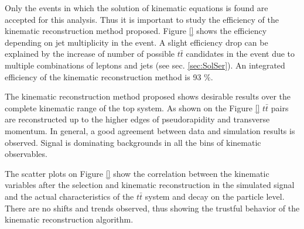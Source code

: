 Only the events in which the solution of kinematic equations is found are accepted for this analysis. Thus it is important to study the efficiency
of the kinematic reconstruction method proposed. Figure \ref{} shows the efficiency depending on jet multiplicity in the event. A slight efficiency
drop can be explained by the increase of number of possible $t\bar{t}$ candidates in the event due to multiple combinations of leptons and jets
(see sec. \ref{sec:SolSer}). An integrated efficiency of the kinematic reconstruction method is 93 $\%$.

The kinematic reconstruction method proposed shows desirable results over the complete kinematic range of the top system. As shown on the Figure \ref{} 
$t\bar{t}$ pairs are reconstructed up to the higher edges of pseudorapidity and transverse momentum. In general, a good agreement between data and
simulation results is observed. Signal is dominating backgrounds in all the bins of kinematic observables.

The scatter plots on Figure \ref{} show the correlation between the kinematic variables after the selection and kinematic reconstruction in the simulated
signal and the actual characteristics of the $t\bar{t}$ system and decay on the particle level. There are no shifts and trends observed, thus showing 
the trustful behavior of the kinematic reconstruction algorithm.

